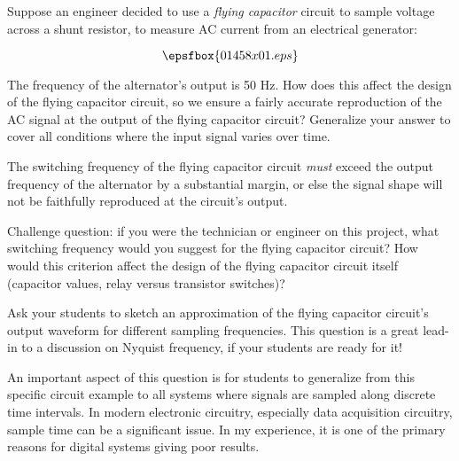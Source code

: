 

Suppose an engineer decided to use a {\it flying capacitor} circuit to sample voltage across a shunt resistor, to measure AC current from an electrical generator:

$$\epsfbox{01458x01.eps}$$

The frequency of the alternator's output is 50 Hz.  How does this affect the design of the flying capacitor circuit, so we ensure a fairly accurate reproduction of the AC signal at the output of the flying capacitor circuit?  Generalize your answer to cover all conditions where the input signal varies over time.







The switching frequency of the flying capacitor circuit {\it must} exceed the output frequency of the alternator by a substantial margin, or else the signal shape will not be faithfully reproduced at the circuit's output.

\vskip 10pt

Challenge question: if you were the technician or engineer on this project, what switching frequency would you suggest for the flying capacitor circuit?  How would this criterion affect the design of the flying capacitor circuit itself (capacitor values, relay versus transistor switches)?







Ask your students to sketch an approximation of the flying capacitor circuit's output waveform for different sampling frequencies.  This question is a great lead-in to a discussion on Nyquist frequency, if your students are ready for it!

An important aspect of this question is for students to generalize from this specific circuit example to all systems where signals are sampled along discrete time intervals.  In modern electronic circuitry, especially data acquisition circuitry, sample time can be a significant issue.  In my experience, it is one of the primary reasons for digital systems giving poor results.




